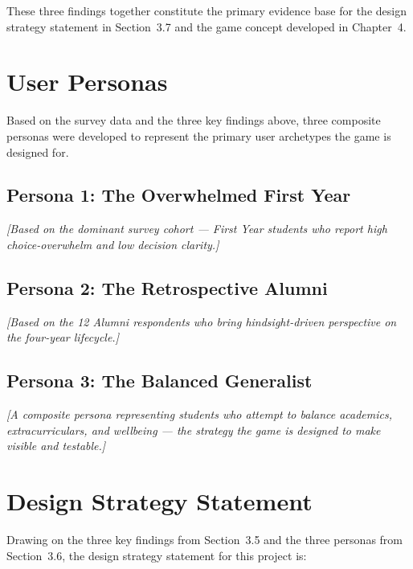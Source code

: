 These three findings together constitute the primary evidence base for the design strategy statement in Section~3.7 and the game concept developed in Chapter~4.


\section{User Personas}

Based on the survey data and the three key findings above, three composite personas were developed to represent the primary user archetypes the game is designed for.

\subsection{Persona 1: The Overwhelmed First Year}
\textit{[Based on the dominant survey cohort --- First Year students who report high choice-overwhelm and low decision clarity.]}

\subsection{Persona 2: The Retrospective Alumni}
\textit{[Based on the 12 Alumni respondents who bring hindsight-driven perspective on the four-year lifecycle.]}

\subsection{Persona 3: The Balanced Generalist}
\textit{[A composite persona representing students who attempt to balance academics, extracurriculars, and wellbeing --- the strategy the game is designed to make visible and testable.]}


\section{Design Strategy Statement}

Drawing on the three key findings from Section~3.5 and the three personas from Section~3.6, the design strategy statement for this project is:

